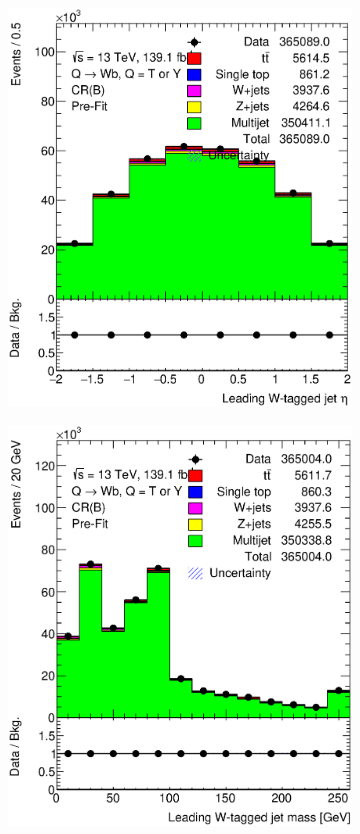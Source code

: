 \begin{figure}[hbt!]
\begin{subfigure}{.35\textwidth}
		\includegraphics[width=\linewidth,height=\textheight,keepaspectratio]{CR_B_ljet_eta.eps}
		\caption{}
		\label{fig:app:cr_b:ljet_eta}
	\end{subfigure}
	\begin{subfigure}{.35\textwidth}
		\centering
		\includegraphics[width=\linewidth,height=\textheight,keepaspectratio]{CR_B_ljet_m.eps}

\end{subfigure}
\end{figure}
